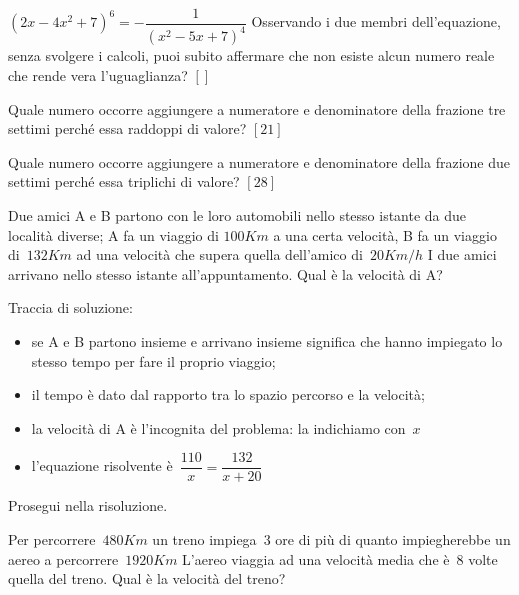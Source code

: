 \begin{esercizio}
\label{ese:20.29}
\(\left(2x-4x^{2}+7\right)^{6}=-{\dfrac{1}{\left(x^{2}-5x+7\right)^{4}}}\) 
Osservando i due membri dell'equazione, senza svolgere i calcoli, puoi subito 
affermare che non esiste alcun numero reale che rende vera l'uguaglianza?
  \hfill \(\left[\right]\)
\end{esercizio}

\begin{esercizio}[\Ast]
\label{ese:20.30}
Quale numero occorre aggiungere a numeratore e denominatore della frazione 
tre settimi perché essa raddoppi di valore?
  \hfill \(\left[21\right]\)
\end{esercizio}

\begin{esercizio}[\Ast]
\label{ese:20.31}
Quale numero occorre aggiungere a numeratore e denominatore della frazione 
due settimi perché essa triplichi di valore?
  \hfill \(\left[28\right]\)
\end{esercizio}

\begin{esercizio}
\label{ese:20.32}
Due amici A e B partono con le loro automobili nello stesso istante da due 
località diverse; A fa un viaggio di \(100\unit{Km}\) a una certa velocità, 
B fa un viaggio di~\(132\unit{Km}\) ad una velocità che supera quella dell'amico 
di~\(20\unit{Km/h}\)
I due amici arrivano nello stesso istante all'appuntamento. 
Qual è la velocità di A?
\begin{center}
 
\end{center}
Traccia di soluzione:
\begin{itemize}
 \item se A e B partono insieme e arrivano insieme significa che hanno 
 impiegato lo stesso tempo per fare il proprio viaggio;
 \item il tempo è dato dal rapporto tra lo spazio percorso e la velocità;
 \item la velocità di A è l'incognita del problema: la indichiamo con~\(x\)
 \item l'equazione risolvente è~\(\dfrac{110}{x}=\dfrac{132}{x+20}\)
\end{itemize}
Prosegui nella risoluzione.
\end{esercizio}

\begin{esercizio}
\label{ese:20.33}
Per percorrere~\(480\unit{Km}\) un treno impiega~\(3\) ore di più di quanto 
impiegherebbe un aereo a percorrere~\(1920\unit{Km}\)
L'aereo viaggia ad una velocità media che è~\(8\) volte quella del treno. 
Qual è la velocità del treno?
\end{esercizio}

